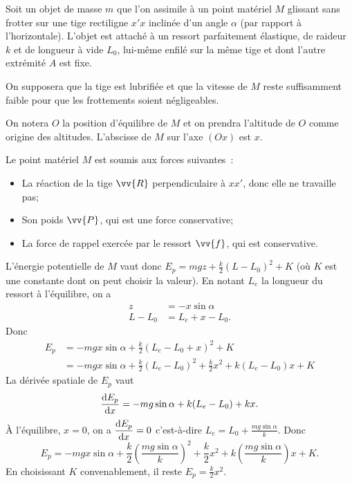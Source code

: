 Soit un objet de masse $m$ que l'on assimile à un point matériel $M$ glissant sans frotter sur une tige rectiligne $x'x$ inclinée d'un angle $\alpha$ (par rapport à l'horizontale). L'objet est attaché à un ressort parfaitement élastique, de raideur $k$ et de longueur à vide $L_0$, lui-même enfilé sur la même tige et dont l'autre extrémité $A$ est fixe.

On supposera que la tige est lubrifiée et que la vitesse de $M$ reste suffisamment faible pour que les frottements soient négligeables.

On notera $O$ la position d'équilibre de $M$ et on prendra l'altitude de $O$ comme origine des altitudes. L'abscisse de $M$ sur l'axe $(Ox)$ est $x$.

Le point matériel $M$ est soumis aux forces suivantes~:
\begin{itemize}
\item La réaction de la tige $\vv{R}$ perpendiculaire à $xx'$, donc elle ne travaille pas;
\item Son poids $\vv{P}$, qui est une force conservative;
\item La force de rappel exercée par le ressort $\vv{f}$, qui est conservative.
\end{itemize}

L'énergie potentielle de $M$ vaut donc $E_p = mgz + \frac{k}{2}(L-L_0)^2 +K$ (où $K$ est une constante dont on peut choisir la valeur). En notant $L_e$ la longueur du ressort à l'équilibre, on a
\begin{align}
  z &= -x \sin \alpha \\
  L-L_0 &= L_e+x-L_0.
\end{align}
Donc
\begin{align}
  E_p &= -mgx \sin \alpha + \frac{k}{2}(L_e-L_0+x)^2 +K \\
  &= -mgx \sin \alpha + \frac{k}{2}(L_e-L_0)^2 +\frac{k}{2}x^2 + k(L_e-L_0)x+K 
\end{align}
La dérivée spatiale de $E_p$ vaut
\begin{equation}
  \dfrac{\mathrm{d} E_p}{\mathrm{d} x} = -mg\sin\alpha + k(L_e-L_0) + kx.
\end{equation}
À l'équilibre, $x=0$, on a $\dfrac{\mathrm{d} E_p}{\mathrm{d} x}=0$ c'est-à-dire $L_e = L_0 + \frac{mg\sin\alpha}{k}$. Donc
\begin{equation}
  E_p = -mgx \sin \alpha + \frac{k}{2}\left(\frac{mg\sin\alpha}{k}\right)^2 +\frac{k}{2}x^2 + k\left(\frac{mg\sin\alpha}{k}\right)x+K.
\end{equation}
En choisissant $K$ convenablement, il reste $E_p = \frac{k}{2}x^2$.


